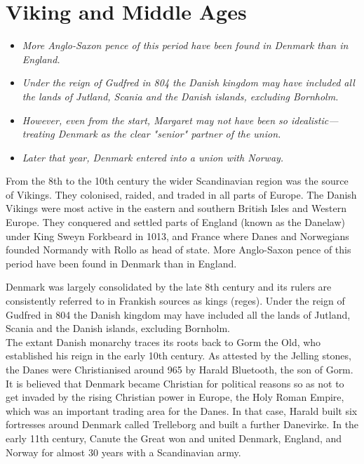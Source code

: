 \section{Viking and Middle Ages}\label{viking-and-middle-ages}

\begin{itemize}
\item
  \emph{More Anglo-Saxon pence of this period have been found in Denmark
  than in England.}
\item
  \emph{Under the reign of Gudfred in 804 the Danish kingdom may have
  included all the lands of Jutland, Scania and the Danish islands,
  excluding Bornholm.}
\item
  \emph{However, even from the start, Margaret may not have been so
  idealistic---treating Denmark as the clear "senior" partner of the
  union.}
\item
  \emph{Later that year, Denmark entered into a union with Norway.}
\end{itemize}

From the 8th to the 10th century the wider Scandinavian region was the
source of Vikings. They colonised, raided, and traded in all parts of
Europe. The Danish Vikings were most active in the eastern and southern
British Isles and Western Europe. They conquered and settled parts of
England (known as the Danelaw) under King Sweyn Forkbeard in 1013, and
France where Danes and Norwegians founded Normandy with Rollo as head of
state. More Anglo-Saxon pence of this period have been found in Denmark
than in England.

Denmark was largely consolidated by the late 8th century and its rulers
are consistently referred to in Frankish sources as kings (reges). Under
the reign of Gudfred in 804 the Danish kingdom may have included all the
lands of Jutland, Scania and the Danish islands, excluding Bornholm.\\
The extant Danish monarchy traces its roots back to Gorm the Old, who
established his reign in the early 10th century. As attested by the
Jelling stones, the Danes were Christianised around 965 by Harald
Bluetooth, the son of Gorm. It is believed that Denmark became Christian
for political reasons so as not to get invaded by the rising Christian
power in Europe, the Holy Roman Empire, which was an important trading
area for the Danes. In that case, Harald built six fortresses around
Denmark called Trelleborg and built a further Danevirke. In the early
11th century, Canute the Great won and united Denmark, England, and
Norway for almost 30 years with a Scandinavian army.

